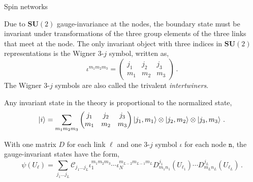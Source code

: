 \documentclass[12pt,titlepage]{article}
\begin{document}
\begin{frame}{Spin networks}
    \begin{list}{\,}{\leftmargin=1em \itemindent=0em}
        \item<1-> Due to $\mathbf{SU}(2)$ gauge-invariance at the nodes, the boundary state must be invariant under transformations of the three group elements of the three links that meet at the node. The only invariant object with three indices in $\mathbf{SU}(2)$ representations is the Wigner 3-$j$ symbol, written as,
        \begin{equation}
            \iota^{m_1m_2m_3}=
            \begin{pmatrix}
                j_1 & j_2 & j_3 \\
                m_1 & m_2 & m_3
            \end{pmatrix}\,.
        \end{equation}
        The Wigner 3-$j$ symbols are also called the trivalent \textit{intertwiners}.
        \item<2-> Any invariant state in the theory is proportional to the normalized state,
        \begin{equation}
            \ket{i}=\sum_{m_1m_2m_3}
            \begin{pmatrix}
                j_1 & j_2 & j_3 \\
                m_1 & m_2 & m_3
            \end{pmatrix}
            \ket{j_1,m_1}\otimes\ket{j_2,m_2}\otimes\ket{j_3,m_3}\,.
        \end{equation}
        \item<3-> With one matrix $D$ for each link $\ell$ and one 3-$j$ symbol $\iota$ for each node $\mathtt{n}$, the gauge-invariant states have the form,
        \begin{equation}
            \psi(U_\ell)=\sum_{j_1\dots j_L}\mathcal{C}_{j_1\dots j_L}\iota^{m_1m_2m_3}_1\cdots\iota^{m_{L-2}m_{L-1}m_L}_N D^{j_1}_{m_1n_1}(U_{\ell_1})\cdots D^{j_L}_{m_Ln_L}(U_{\ell_L})\,.
        \end{equation} 
    \end{list}
\end{frame}
\end{document}
